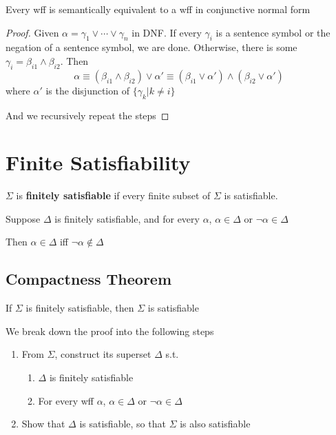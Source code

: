 \begin{theorem}
    \label{thm:CompletenessOfCNF}
    Every wff is semantically equivalent to a wff in conjunctive normal form
\end{theorem}
\begin{proof}
    Given $\alpha=\gamma_1\vee\cdots\vee\gamma_n$ in DNF. If every $\gamma_i$ is a sentence symbol or the negation of a sentence symbol, we are done. Otherwise, there is some $\gamma_i = \beta_{i1}\wedge\beta_{i2}$. Then
    \[ \alpha \equiv (\beta_{i1} \wedge \beta_{i2}) \vee \alpha' \equiv (\beta_{i1}\vee\alpha') \wedge (\beta_{i2}\vee\alpha') \]
    where $\alpha'$ is the disjunction of $\{\gamma_k|k \neq i\}$

    And we recursively repeat the steps
\end{proof}

\section{Finite Satisfiability}
\label{sec:FiniteSatisfiability}

\begin{definition}
    \label{def:FiniteSatisfiability}
    $\Sigma$ is \textbf{finitely satisfiable} if every finite subset of $\Sigma$ is satisfiable.
\end{definition}
\begin{remark}
    Suppose $\Delta$ is finitely satisfiable, and for every $\alpha$, $\alpha\in\Delta$ or $\neg\alpha\in\Delta$

    Then $\alpha\in\Delta$ iff $\neg\alpha\notin\Delta$
\end{remark}


\subsection{Compactness Theorem}

\begin{theorem}
    \label{thm:CompactnessTheorem}
    If $\Sigma$ is finitely satisfiable, then $\Sigma$ is satisfiable
\end{theorem}
\begin{sketchproof}
    We break down the proof into the following steps
    \begin{enumerate}
        \item From $\Sigma$, construct its superset $\Delta$ s.t.
        \begin{enumerate}
            \item $\Delta$ is finitely satisfiable
            \item For every wff $\alpha$, $\alpha\in\Delta$ or $\neg\alpha\in\Delta$
        \end{enumerate}
        \item Show that $\Delta$ is satisfiable, so that $\Sigma$ is also satisfiable
    \end{enumerate}
\end{sketchproof}

